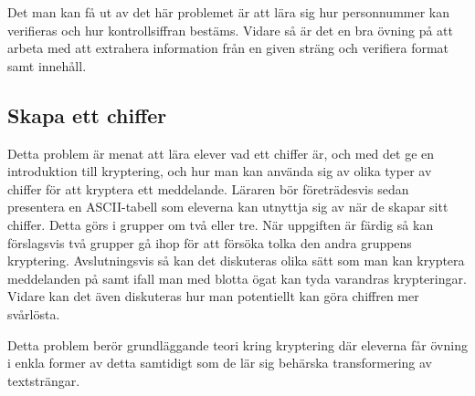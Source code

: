     \textcolor{WildStrawberry}{
        Det man kan få ut av det här problemet är att lära sig hur personnummer kan verifieras och hur kontrollsiffran bestäms. Vidare så är det en bra övning på att arbeta med att extrahera information från en given sträng och verifiera format samt innehåll.
        }

\subsection{Skapa ett chiffer}
    \label{sec:chiffer}
    
    \textcolor{WildStrawberry}{
        Detta problem är menat att lära elever vad ett chiffer är, och med det ge en introduktion till kryptering, och hur man kan använda sig av olika typer av chiffer för att kryptera ett meddelande. Läraren bör företrädesvis sedan presentera en ASCII-tabell som eleverna kan utnyttja sig av när de skapar sitt chiffer. Detta görs i grupper om två eller tre. När uppgiften är färdig så kan förslagsvis två grupper gå ihop för att försöka tolka den andra gruppens kryptering. Avslutningsvis så kan det diskuteras olika sätt som man kan kryptera meddelanden på samt ifall man med blotta ögat kan tyda varandras krypteringar. Vidare kan det även diskuteras hur man potentiellt kan göra chiffren mer svårlösta.}
        
    \textcolor{WildStrawberry}{
        Detta problem berör grundläggande teori kring kryptering där eleverna får övning i enkla former av detta samtidigt som de lär sig behärska transformering av textsträngar.
        }